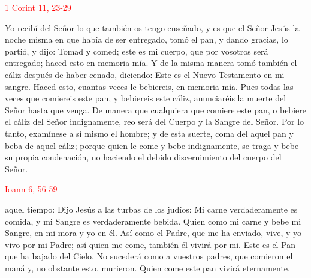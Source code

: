 \documentclass[10pt]{article}
\begin{document}
\begin{multicols}{2}
      \hfill\textcolor{red}{1 Corint 11, 23-29}

      Yo recibí del Señor lo que también os tengo enseñado, y es que el Señor Jesús la noche misma en que había de ser entregado, tomó el pan, y dando gracias, lo partió, y dijo:
      Tomad y comed; este es mi cuerpo, que por vosotros será entregado; haced esto en memoria mía. Y de la misma manera tomó también el cáliz después de haber cenado, diciendo: Este es el
      Nuevo Testamento en mi sangre. Haced esto, cuantas veces le bebiereis, en memoria mía. Pues todas las veces que comiereis este pan, y bebiereis este cáliz, anunciaréis la muerte del
      Señor hasta que venga. De manera que cualquiera que comiere este pan, o bebiere el cáliz del Señor indignamente, reo será del Cuerpo y la Sangre del Señor. Por lo tanto, examínese a
      sí mismo el hombre; y de esta suerte, coma del aquel pan y beba de aquel cáliz; porque quien le come y bebe indignamente, se traga y bebe su propia condenación, no haciendo el debido
      discernimiento del cuerpo del Señor.

      \vspace{2mm}

      \hfill\textcolor{red}{Ioann 6, 56-59}

      aquel tiempo: Dijo Jesús a las turbas de los judíos: Mi carne verdaderamente es comida, y mi Sangre es verdaderamente bebida. Quien como mi carne y bebe mi Sangre, en mi mora y yo en él.
      Así como el Padre, que me ha enviado, vive, y yo vivo por mi Padre; así quien me come, también él vivirá por mi. Este es el Pan que ha bajado del Cielo. No sucederá como a vuestros padres,
      que comieron el maná y, no obstante esto, murieron. Quien come este pan vivirá eternamente.

      \vspace{2mm}

      \begin{otherlanguage}{latin}
            

            \vspace{1mm}

            

            \vspace{1mm}

            
      \end{otherlanguage}


\end{multicols}
\end{document}
